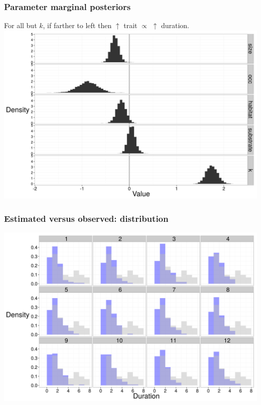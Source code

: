 \documentclass{beamer}
\begin{document}


\begin{frame}
  \frametitle{Parameter marginal posteriors}
  \begin{center}
    For all but \(k\), if farther to \alert{left} then \(\uparrow\) trait \(\propto\) \(\uparrow\) duration.
    \includegraphics[height = 0.7\textheight, width = \textwidth, keepaspectratio = true]{figure/wei_post}
  \end{center}
\end{frame}

\begin{frame}
  \frametitle{Estimated versus observed: distribution}
  \begin{center}
    \includegraphics[height = 0.8\textheight, width = \textwidth, keepaspectratio = true]{figure/wei_dur_post}
  \end{center}
\end{frame}
\end{document}
